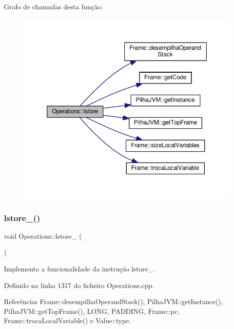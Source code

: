 Grafo de chamadas desta função\+:\nopagebreak
\begin{figure}[H]
\begin{center}
\leavevmode
\includegraphics[width=347pt]{classOperations_a233917ec136fa6ce064f04b410e15f87_cgraph}
\end{center}
\end{figure}
\mbox{\label{classOperations_ae3c949d56a3ee685668134493595334b}} 
\subsubsection{\texorpdfstring{lstore\+\_()}{lstore\_0()}}
{\footnotesize\ttfamily void Operations\+::lstore\+\_ (\begin{DoxyParamCaption}{ }\end{DoxyParamCaption})\hspace{0.3cm}{\ttfamily [private]}}



Implementa a funcionalidade da instrução lstore\+\_. 



Definido na linha 1317 do ficheiro Operations.\+cpp.



Referências Frame\+::desempilha\+Operand\+Stack(), Pilha\+J\+V\+M\+::get\+Instance(), Pilha\+J\+V\+M\+::get\+Top\+Frame(), L\+O\+NG, P\+A\+D\+D\+I\+NG, Frame\+::pc, Frame\+::troca\+Local\+Variable() e Value\+::type.



